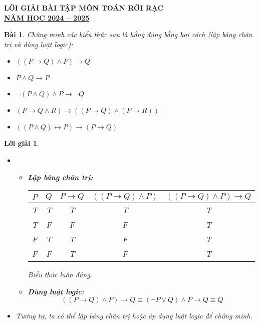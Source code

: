 \documentclass[11pt, oneside, a4paper]{article}
\newtheorem{bt}{Bài}[section]
\newtheorem{loigiai}{Lời giải}[bt]
\begin{document}
\begin{center}
    \Large \textbf{LỜI GIẢI BÀI TẬP MÔN TOÁN RỜI RẠC}\\
    \textbf{\underline{NĂM HỌC 2024 -- 2025}}\\
\end{center}

\tableofcontents
\newpage


\begin{bt}
Chứng minh các biểu thức sau là hằng đúng bằng hai cách (lập bảng chân trị và dùng luật logic): 
\begin{itemize}
    \item[a)] $((P \rightarrow Q) \land P) \rightarrow Q$
    \item[b)] $P \land Q \rightarrow P$
    \item[c)] $\lnot (P \land Q) \land P \rightarrow \lnot Q$
    \item[d)] $(P \rightarrow Q \land R) \rightarrow ((P \rightarrow Q) \land (P \rightarrow R))$
    \item[e)] $((P \land Q) \leftrightarrow P) \rightarrow (P \rightarrow Q)$
\end{itemize}
\end{bt}

\begin{loigiai}
\begin{itemize}
    \item[a)] 
    \begin{itemize}
        \item \textbf{Lập bảng chân trị:}
        \begin{center}
            \begin{tabular}{|c|c|c|c|c|}
                \hline
                $P$ & $Q$ & $P \rightarrow Q$ & $((P \rightarrow Q) \land P)$ & $((P \rightarrow Q) \land P) \rightarrow Q$ \\
                \hline
                T & T & T & T & T \\
                T & F & F & F & T \\
                F & T & T & F & T \\
                F & F & T & F & T \\
                \hline
            \end{tabular}
        \end{center}
        Biểu thức luôn đúng.
        \item \textbf{Dùng luật logic:}
        \[
        ((P \rightarrow Q) \land P) \rightarrow Q \equiv (\lnot P \lor Q) \land P \rightarrow Q \equiv Q
        \]
    \end{itemize}

    \item[b)] Tương tự, ta có thể lập bảng chân trị hoặc áp dụng luật logic để chứng minh.
\end{itemize}
\end{loigiai}
\end{document}
